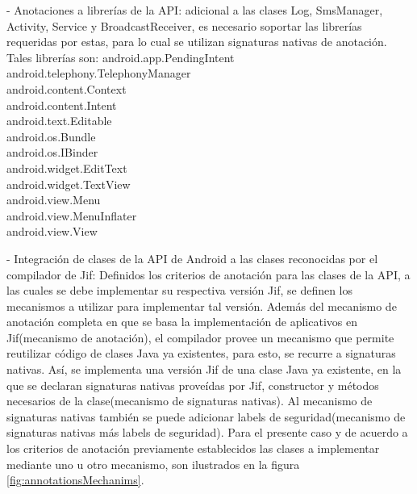 - Anotaciones a librerías de la API: 
adicional a las clases Log, SmsManager, Activity, Service y
BroadcastReceiver, es necesario soportar las librerías requeridas por estas,
para lo cual se utilizan signaturas nativas de anotación. Tales librerías son:
android.app.PendingIntent\\
android.telephony.TelephonyManager\\
android.content.Context\\
android.content.Intent\\
android.text.Editable\\
android.os.Bundle\\
android.os.IBinder\\
android.widget.EditText\\
android.widget.TextView\\ 
android.view.Menu\\
android.view.MenuInflater\\
android.view.View 

% 
- Integración de clases de la API de Android a las clases reconocidas por el
compilador de Jif:\newline
Definidos los criterios de anotación para las clases de la API, a las cuales se
debe implementar su respectiva versión Jif, se definen los mecanismos a utilizar
para implementar tal versión. Además del mecanismo de anotación completa en que
se basa la implementación de aplicativos en Jif(mecanismo de anotación), el
compilador provee un mecanismo que permite reutilizar código de clases Java ya
existentes, para esto, se recurre a signaturas nativas. Así, se implementa una
versión Jif de una clase Java ya existente, en la que se declaran signaturas
nativas proveídas por Jif, constructor y métodos necesarios de la
clase(mecanismo de signaturas nativas).
Al mecanismo de signaturas nativas también se puede  adicionar labels de
seguridad(mecanismo de signaturas nativas más labels de seguridad).\newline
Para el presente caso y de acuerdo a los criterios de anotación previamente
establecidos las clases a implementar mediante uno u otro mecanismo, son
ilustrados en la figura \ref{fig:annotationsMechanims}.\newline

